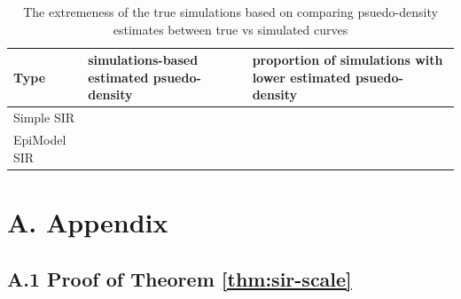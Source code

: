 \documentclass[
  shortnames]{jss}
\begin{document}
\begin{CodeChunk}
\begin{table}[!h]

\caption{\label{tab:hags-extreme}The extremeness of the true simulations based on comparing psuedo-density estimates between true vs simulated curves}
\centering
\begin{tabular}[t]{l>{\raggedleft\arraybackslash}p{6cm}>{\raggedleft\arraybackslash}p{6cm}}
\toprule
Type & simulations-based estimated psuedo-density & proportion of simulations with lower estimated psuedo-density\\
\midrule
Simple SIR & 0.0036733 & 0\\
EpiModel SIR & 0.0028813 & 0\\
\bottomrule
\end{tabular}
\end{table}

\end{CodeChunk}

\hypertarget{a.-appendix}{%
\section*{A. Appendix}\label{a.-appendix}}

\hypertarget{a.1-proof-of-theorem}{%
\subsection*{\texorpdfstring{A.1 Proof of Theorem
\ref{thm:sir-scale}}{A.1 Proof of Theorem }}\label{a.1-proof-of-theorem}}
\end{document}
